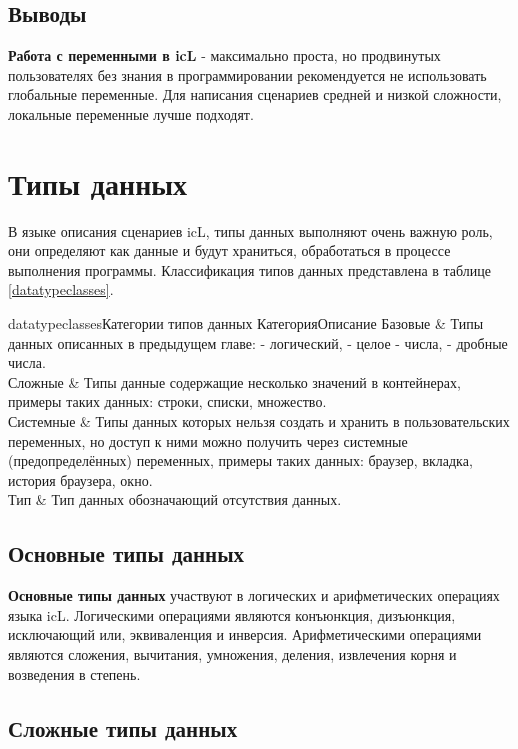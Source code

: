 \documentclass[a4paper, 14pt]{extarticle}
\begin{document}
\subsection{Выводы}

{\bf Работа с переменными в icL} - максимально проста, но продвинутых пользователях без знания в программировании рекомендуется не использовать глобальные переменные. Для написания сценариев средней и низкой сложности, локальные переменные лучше подходят.

\section{Типы данных}

В языке описания сценариев icL, типы данных выполняют очень важную роль, они определяют как данные и будут храниться, обработаться в процессе выполнения программы. Классификация типов данных представлена в таблице \ref{datatypeclasses}.

\stabletwo{3.5cm}{13.6cm}
{datatypeclasses}{Категории типов данных}
{Категория}{Описание}
{
	Базовые     & Типы данных описанных в предыдущем главе: \bool{}{} - логический, \integer{} - целое - числа, \double{} - дробные числа. \\ \hline
	Сложные     & Типы данные содержащие несколько значений в контейнерах, примеры таких данных: строки, списки, множество. \\ \hline
	Системные   & Типы данных которых нельзя создать и хранить в пользовательских переменных, но доступ к ними можно получить через системные (предопределённых) переменных, примеры таких данных: браузер, вкладка, история браузера, окно. \\ \hline
	Тип \void{} & Тип данных обозначающий отсутствия данных.
}

\subsection{Основные типы данных}

{\bf Основные типы данных} участвуют в логических и арифметических операциях языка icL. Логическими операциями являются конъюнкция, дизъюнкция, исключающий или, эквиваленция и инверсия. Арифметическими операциями являются сложения, вычитания, умножения, деления, извлечения корня и возведения в степень.

\subsection{Сложные типы данных}
\end{document}
